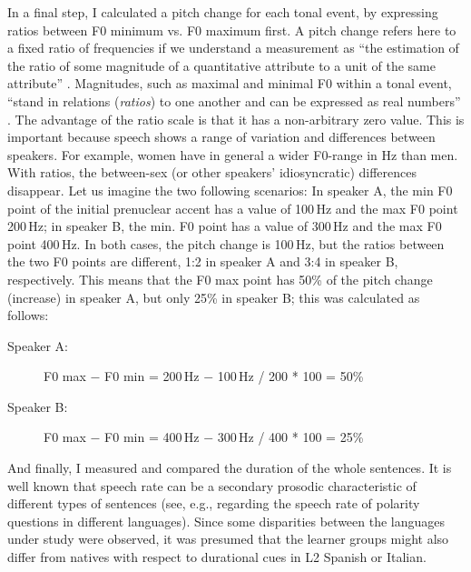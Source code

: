 In a final step, I calculated a pitch change for each tonal event, by expressing ratios between F0 minimum vs. F0 maximum first. A pitch change refers here to a fixed ratio of frequencies if we understand a measurement as “the estimation of the ratio of some magnitude of a quantitative attribute to a unit of the same attribute” \citep[358]{Michell1997}. Magnitudes, such as maximal and minimal F0 within a tonal event, “stand in relations (\textit{ratios}) to one another and can be expressed as real numbers” \citep[356]{Michell1997}. The advantage of the ratio scale is that it has a non-arbitrary zero value. This is important because speech shows a range of variation and differences between speakers. For example, women have in general a wider F0-range in Hz than men. With ratios, the between-sex (or other speakers’ idiosyncratic) differences disappear. Let us imagine the two following scenarios: In speaker A, the min F0 point of the initial prenuclear accent has a value of 100\,Hz and the max F0 point 200\,Hz; in speaker B, the min. F0 point has a value of 300\,Hz and the max F0 point 400\,Hz. In both cases, the pitch change is 100\,Hz, but the ratios between the two F0 points are different, 1:2 in speaker A and 3:4 in speaker B, respectively. This means that the F0 max point has 50\% of the pitch change (increase) in speaker A, but only 25\% in speaker B; this was calculated as follows:

\begin{description}
\item [Speaker A:]   F0 max $-$ F0 min = 200\,Hz $-$ 100\,Hz / 200 * 100 = 50\%
\item [Speaker B:]   F0 max $-$ F0 min = 400\,Hz $-$ 300\,Hz / 400 * 100 = 25\%
\end{description}


And finally, I measured and compared the duration of the whole sentences. It is well known that speech rate can be a secondary prosodic characteristic of different types of sentences (see, e.g., \citealt{vanHeuvenvanZanten2005} regarding the speech rate of polarity questions in different languages). Since some disparities between the languages under study were observed, it was presumed that the learner groups might also differ from natives with respect to durational cues in L2 Spanish or Italian.
